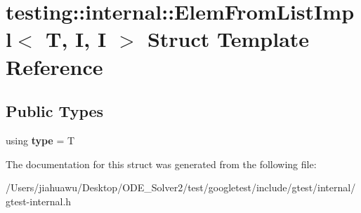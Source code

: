 \hypertarget{structtesting_1_1internal_1_1_elem_from_list_impl_3_01_t_00_01_i_00_01_i_01_4}{}\section{testing\+:\+:internal\+:\+:Elem\+From\+List\+Impl$<$ T, I, I $>$ Struct Template Reference}
\label{structtesting_1_1internal_1_1_elem_from_list_impl_3_01_t_00_01_i_00_01_i_01_4}
\subsection*{Public Types}
\begin{DoxyCompactItemize}
\item 
\mbox{\label{structtesting_1_1internal_1_1_elem_from_list_impl_3_01_t_00_01_i_00_01_i_01_4_ab1552e339cc1ff1e0aa448d684ffaf39}} 
using {\bfseries type} = T
\end{DoxyCompactItemize}


The documentation for this struct was generated from the following file\+:\begin{DoxyCompactItemize}
\item 
/\+Users/jiahuawu/\+Desktop/\+O\+D\+E\+\_\+\+Solver2/test/googletest/include/gtest/internal/gtest-\/internal.\+h\end{DoxyCompactItemize}
